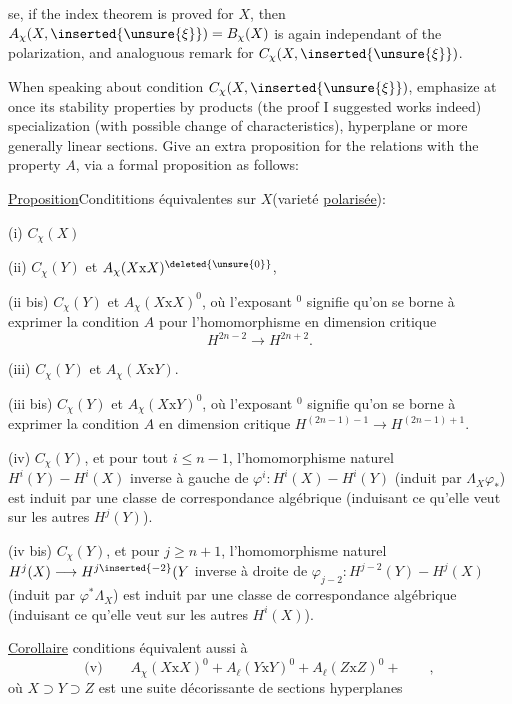 se, if the index theorem is proved for $X$, then $A_{\chi}(X,\inserted{\unsure{\xi}})=B_{\chi}(X)$ is again independant of the polarization, and analoguous remark for $C_{\chi}(X,\inserted{\unsure{\xi}})$.

When speaking about condition $C_{\chi}(X,\inserted{\unsure{\xi}})$, emphasize at once its stability properties by products (the proof I suggested works indeed) specialization (with possible change of characteristics), hyperplane or more generally linear sections. Give an extra proposition for the relations with the property $A$, via a formal proposition as follows:

\uline{Proposition}\quad Condititions équivalentes sur $X$(varieté \uline{polarisée}):

(i) $C_{\chi}(X)$

(ii) $C_{\chi}(Y)$ et $A_{\chi}(X\mathrm{x}X)^{\deleted{\unsure{0}}}$, 

(ii bis) $C_{\chi}(Y)$ et $A_{\chi}(X\mathrm{x}X)^0$, où l'exposant $^0$ signifie qu'on se borne à exprimer la condition $A$ pour l'homomorphisme en dimension critique
\[
H^{2n-2}\longrightarrow H^{2n+2}.
\]

(iii) $C_{\chi}(Y)$ et $A_{\chi}(X\mathrm{x}Y)$.

(iii bis) $C_{\chi}(Y)$ et $A_{\chi}(X\mathrm{x}Y)^0$, où l'exposant $^0$ signifie qu'on se borne à exprimer la condition $A$ en dimension critique $H^{(2n-1)-1}\longrightarrow H^{(2n-1)+1}$.

(iv)  $C_{\chi}(Y)$, et pour tout $i\leq n-1$, l'homomorphisme naturel $H^i(Y)\mathbin{-}H^i(X)$ inverse à gauche de $\varphi^i:H^i(X)\mathbin{-}H^i(Y)$ (induit par $\Lambda_X\varphi_{*}$) est induit par une classe de correspondance algébrique (induisant ce qu'elle veut sur les autres $H^j(Y)$).

(iv bis) $C_{\chi}(Y)$, et pour $j\geq n+1$, l'homomorphisme naturel $H^j(X)\longrightarrow H^{j\inserted{-2}}(Y$ inverse à droite de $\varphi_{j-2}:H^{j-2}(Y)\mathbin{-}H^j(X)$  (induit par $\varphi^*\Lambda_X$) est induit par une classe de correspondance algébrique (induisant ce qu'elle veut sur les autres $H^i(X)$).

\uline{Corollaire}\quad {} conditions équivalent aussi à
\[
\text{(v)}\qquad A_{\chi}(X\mathrm{x}X)^0+A_{\ell}(Y\mathrm{x}Y)^0+A_{\ell}(Z\mathrm{x}Z)^0+\qquad,
\]
où $X\supset Y\supset Z$ est une suite décorissante de sections hyperplanes
